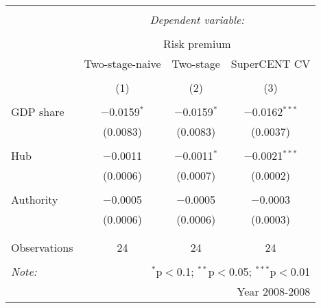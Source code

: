
\begin{table}[!htbp] \centering 
  \caption{} 
  \label{} 
\begin{tabular}{@{\extracolsep{5pt}}lccc} 
\\[-1.8ex]\hline 
\hline \\[-1.8ex] 
 & \multicolumn{3}{c}{\textit{Dependent variable:}} \\ 
\cline{2-4} 
\\[-1.8ex] & \multicolumn{3}{c}{Risk premium} \\ 
 & Two-stage-naive & Two-stage & SuperCENT CV \\ 
\\[-1.8ex] & (1) & (2) & (3)\\ 
\hline \\[-1.8ex] 
 GDP share & $-$0.0159$^{*}$ & $-$0.0159$^{*}$ & $-$0.0162$^{***}$ \\ 
  & (0.0083) & (0.0083) & (0.0037) \\ 
  & & & \\ 
 Hub & $-$0.0011 & $-$0.0011$^{*}$ & $-$0.0021$^{***}$ \\ 
  & (0.0006) & (0.0007) & (0.0002) \\ 
  & & & \\ 
 Authority & $-$0.0005 & $-$0.0005 & $-$0.0003 \\ 
  & (0.0006) & (0.0006) & (0.0003) \\ 
  & & & \\ 
\hline \\[-1.8ex] 
Observations & 24 & 24 & 24 \\ 
\hline 
\hline \\[-1.8ex] 
\textit{Note:}  & \multicolumn{3}{r}{$^{*}$p$<$0.1; $^{**}$p$<$0.05; $^{***}$p$<$0.01} \\ 
 & \multicolumn{3}{r}{Year 2008-2008} \\ 
\end{tabular} 
\end{table} 
